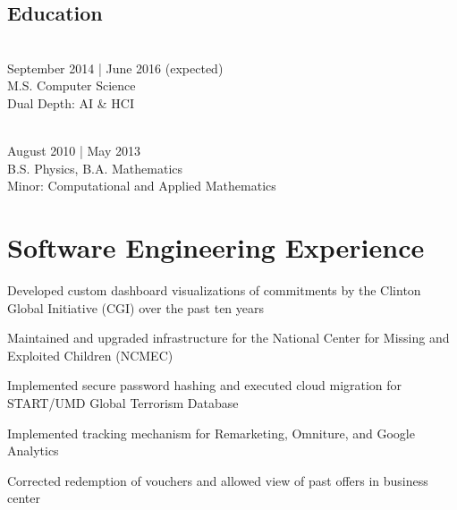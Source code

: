 \documentclass{onkursen-resume}
\begin{document}
\vspace{0.5mm}

\begin{multicols}{2}

\section*{Education}

\\
September 2014 | June 2016 (expected)\\
M.S. Computer Science\\
Dual Depth: AI \& HCI\\

\vspace{6mm}

\\
August 2010 | May 2013\\
B.S. Physics, B.A. Mathematics\\
Minor: Computational and Applied Mathematics

\end{multicols}

\vspace{-1mm}

\hr

\section*{Software Engineering Experience}

\begin{itemize*}
\item Developed custom dashboard visualizations of commitments by the Clinton Global Initiative (CGI) over the past ten years
\item Maintained and upgraded infrastructure for the National Center for Missing and Exploited Children (NCMEC)
\item Implemented secure password hashing and executed cloud migration for START/UMD Global Terrorism Database
\end{itemize*}

\begin{itemize*}
\item Implemented tracking mechanism for Remarketing, Omniture, and Google Analytics
\item Corrected redemption of vouchers and allowed view of past offers in business center
\end{itemize*}
\end{document}
